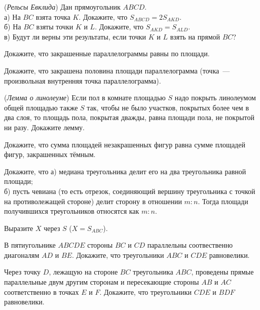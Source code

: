 \begin{problems}

\item (\textit{Рельсы Евклида})
Дан прямоугольник $ABCD$. \\
а) На $BC$ взята точка $K$. Докажите, что $S_{ABCD} = 2 S_{AKD}$.\\
б) На $BC$ взяты точки $K$ и $L$. Докажите, что $S_{AKD} = S_{ALD}$. \\
в) Будут ли верны эти результаты, если точки $K$ и $L$ взять на прямой $BC$? \\ 
\item
Докажите, что закрашенные параллелограммы равны по площади.

\item
Докажите, что закрашена половина площади параллелограмма (точка~--- произвольная внутренняя точка параллелограмма). 

\item (\textit{Лемма о линолеуме}) Если пол в комнате площадью $S$ надо покрыть линолеумом общей площадью также $S$ так, чтобы не было участков, покрытых более чем в два слоя, то площадь пола, покрытая дважды, равна площади пола, не покрытой ни разу. Докажите лемму.


\item
Докажите, что сумма площадей незакрашенных фигур равна сумме площадей фигур, закрашенных тёмным.


\item
Докажите, что а) медиана треугольника делит его на два треугольника равной площади;\\
б) пусть чевиана (то есть отрезок, соединяющий вершину треугольника с точкой на противолежащей стороне) делит сторону в отношении $m:n$. Тогда площади получившихся треугольников относятся как $m:n$. 

\item
Выразите $X$ через $S$ ($X = S_{ABC}$). \\
\item
В пятиугольнике $ABCDE$ стороны $BC$ и $CD$ параллельны соотвественно диагоналям $AD$ и $BE$. Докажите, что треугольники $ABC$ и $CDE$ равновелики.

\item
Через точку $D$, лежащую на стороне $BC$ треугольника $ABC$, проведены прямые параллельные двум другим сторонам и пересекающие стороны $AB$ и $AC$ соответственно в точках $E$ и $F$. Докажите, что треугольники $CDE$ и $BDF$ равновелики.


\end{problems}
